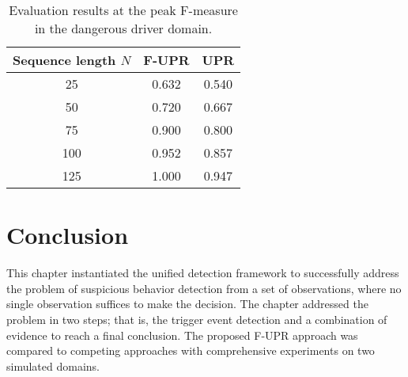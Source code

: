 {\begin{table}[]
\centering
\caption{Evaluation results at the peak F-measure in the dangerous driver domain.}
\begin{tabular}{ccc}
\toprule
	Sequence length $N$ & F-UPR & UPR	\\
	\hline
	25 	&	0.632	&	0.540	\\
	50 	&	0.720	&	0.667	\\
	75 	&	0.900	&	0.800	\\
	100 &	0.952	&	0.857	\\
	125 &	1.000	&	0.947	\\
\toprule
\end{tabular}
\label{tab:zigzag}
\end{table}


\section{Conclusion}
\label{sec:Conclusion}
\noindent
This chapter instantiated the unified detection framework to successfully address the problem of suspicious behavior detection from a set of observations, where no single observation suffices to make the decision. The chapter addressed the problem in two steps; that is, the trigger event detection and a combination of evidence to reach a final conclusion. The proposed F-UPR approach was compared to competing approaches with comprehensive experiments on two simulated domains.





}

